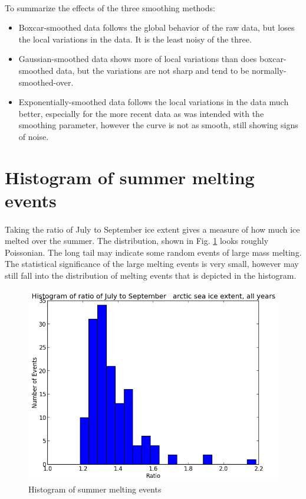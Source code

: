 \documentclass[12pt,a4paper]{article} %
\begin{document}
\paragraph{}
To summarize the effects of the three smoothing methods: 
\begin{itemize}
\item Boxcar-smoothed data follows the global behavior of the raw data, but loses the local variations in the data.  It is the least noisy of the three.
\item Gaussian-smoothed data shows more of local variations than does boxcar-smoothed data, but the variations are not sharp and tend to be normally-smoothed-over.
\item Exponentially-smoothed data follows the local variations in the data much better, especially for the more recent data as was intended with the smoothing parameter, however the curve is not as smooth, still showing signs of noise.
\end{itemize}


\section{Histogram of summer melting events}
\paragraph{}Taking the ratio of July to September ice extent gives a measure of how much ice melted over the summer. The distribution, shown in Fig. \ref{hist} looks roughly Poissonian. The long tail may indicate some random events of large mass melting. The statistical significance of the large melting events is very small, however may still fall into the distribution of melting events that is depicted in the histogram.

\begin{figure}[!hbp]
\centering
 \includegraphics[width=0.75\linewidth]{../output/annual_ratio_hist.png}
\caption{Histogram of summer melting events}
\label{hist}
\end{figure}
\end{document}
